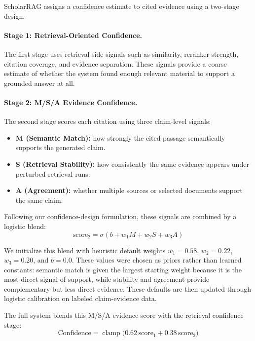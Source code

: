 \documentclass[10pt]{article}
\begin{document}
ScholarRAG assigns a confidence estimate to cited evidence using a
two-stage design.

\paragraph{Stage 1: Retrieval-Oriented Confidence.}
The first stage uses retrieval-side signals such as similarity,
reranker strength, citation coverage, and evidence separation. These
signals provide a coarse estimate of whether the system found enough
relevant material to support a grounded answer at all.

\paragraph{Stage 2: M/S/A Evidence Confidence.}
The second stage scores each citation using three claim-level signals:
\begin{itemize}
    \item \textbf{M (Semantic Match):} how strongly the cited passage
    semantically supports the generated claim.
    \item \textbf{S (Retrieval Stability):} how consistently the same
    evidence appears under perturbed retrieval runs.
    \item \textbf{A (Agreement):} whether multiple sources or selected
    documents support the same claim.
\end{itemize}

Following our confidence-design formulation, these signals are combined
by a logistic blend:
\begin{equation}
\text{score}_2 = \sigma(b + w_1M + w_2S + w_3A)
\end{equation}

We initialize this blend with heuristic default weights
$w_1 = 0.58$, $w_2 = 0.22$, $w_3 = 0.20$, and $b = 0.0$. These values
were chosen as priors rather than learned constants: semantic match is
given the largest starting weight because it is the most direct signal
of support, while stability and agreement provide complementary but
less direct evidence. These defaults are then updated through logistic
calibration on labeled claim-evidence data.

The full system blends this M/S/A evidence score with the retrieval
confidence stage:
\begin{equation}
\text{Confidence} =
\operatorname{clamp}\bigl(
0.62\,\text{score}_1 + 0.38\,\text{score}_2
\bigr)
\end{equation}
\end{document}
